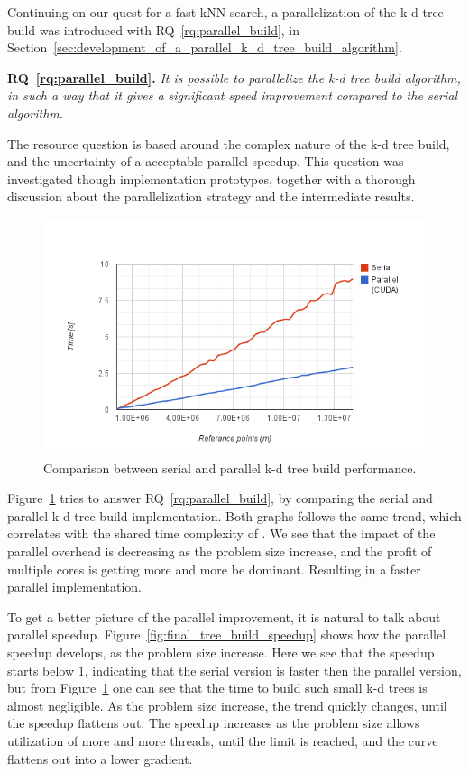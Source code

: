 Continuing on our quest for a fast kNN search, a parallelization of the k-d tree build was introduced with RQ~\ref{rq:parallel_build}, in Section~\ref{sec:development_of_a_parallel_k_d_tree_build_algorithm}.

\textbf{RQ~\ref{rq:parallel_build}.} \emph{It is possible to parallelize the k-d tree build algorithm, in such a way that it gives a significant speed improvement compared to the serial algorithm.}

The resource question is based around the complex nature of the k-d tree build, and the uncertainty of a acceptable parallel speedup. This question was investigated though implementation prototypes, together with a thorough discussion about the parallelization strategy and the intermediate results. 

\begin{figure}[ht!]
    \centering
    \includegraphics[width=120mm]{../gfx/final_tree_build.png}
    \caption{Comparison between serial and parallel k-d tree build performance.}
    \label{fig:final_tree_build}
\end{figure}

Figure~\ref{fig:final_tree_build} tries to answer RQ~\ref{rq:parallel_build}, by comparing the serial and parallel k-d tree build implementation. Both graphs follows the same trend, which correlates with the shared time complexity of . We see that the impact of the parallel overhead is decreasing as the problem size increase, and the profit of multiple cores is getting more and more be dominant. Resulting in a faster parallel implementation.

To get a better picture of the parallel improvement, it is natural to talk about parallel speedup. Figure~\ref{fig:final_tree_build_speedup} shows how the parallel speedup develops, as the problem size increase. Here we see that the speedup starts below $1$, indicating that the serial version is faster then the parallel version, but from Figure~\ref{fig:final_tree_build} one can see that the time to build such small k-d trees is almost negligible. As the problem size increase, the trend quickly changes, until the speedup flattens out. The speedup increases as the problem size allows utilization of more and more threads, until the limit is reached, and the curve flattens out into a lower gradient.      

